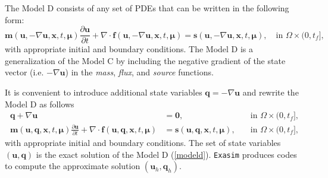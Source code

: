 \documentclass[11pt]{article}
\begin{document}
The Model D consists of any set of PDEs that can be written in the following form:
\begin{equation}
\label{modeld0}
\bm m(\bm{u}, - \nabla \bm u, \bm x,t, \bm \mu) \frac{\partial \bm{u}}{\partial t} + \nabla \cdot \bm{f}(\bm{u}, - \nabla \bm u, \bm x,t, \bm \mu) = \bm s(\bm{u}, - \nabla \bm u, \bm x,t, \bm \mu), \quad \mbox{in } \Omega \times (0, t_f], 
\end{equation}
with appropriate initial and boundary conditions. The Model D is a generalization of the Model C by including the negative gradient of the state vector (i.e. $- \nabla \bm u$) in the {\em mass}, {\em flux}, and {\em source} functions.

It is convenient to introduce additional state variables $\bm q = - \nabla \bm u$  and rewrite the Model D as follows
\begin{subequations}
\label{modeld}
\begin{alignat}{2}
\bm q + \nabla \bm u & =  \bm 0,  & \quad \mbox{in } \Omega \times (0, t_f], \\
\bm m(\bm{u}, \bm q, \bm x,t, \bm \mu) \frac{\partial \bm{u}}{\partial t} + \nabla \cdot \bm{f}(\bm{u}, \bm q, \bm x,t, \bm \mu) &=  \bm s(\bm{u}, \bm q, \bm x,t, \bm \mu), & \quad \mbox{in } \Omega \times (0, t_f], 
\end{alignat}
\end{subequations}
with appropriate initial and boundary conditions. The set of state variables $(\bm u, \bm q)$ is the exact solution of the Model D (\ref{modeld}). \texttt{Exasim} produces codes to compute the approximate solution $(\bm u_h, \bm q_h)$.

\end{document}
